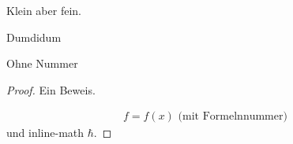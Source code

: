 \documentclass[ngerman,a4paper]{report}
\theoremstyle{break}
\theoremstyle{nonumberbreak}
\begin{document}
\begin{truelemma}
    Klein aber fein.
\end{truelemma}

\begin{trueremark}[Hossa]
    Dumdidum
\end{trueremark}

\begin{*trueexample}[Test]
    Ohne Nummer
\end{*trueexample}

\begin{proof}
    Ein Beweis.
    
    \begin{align}
    f = f(x) \text{ (mit Formelnnummer)}
    \end{align}
    und inline-math $\hbar$.
\end{proof}

\end{document}

